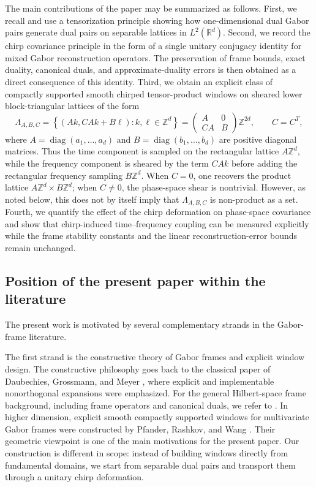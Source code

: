 \documentclass[final,1p,times,authoryear]{elsarticle}
\theoremstyle{definition}
\newcommand{\R}{\mathbb{R}}
\newcommand{\Z}{\mathbb{Z}}
\newcommand{\1}{\mathbf{1}}
\begin{document}
The main contributions of the paper may be summarized as follows. First, we recall and use a
tensorization principle showing how one-dimensional dual Gabor pairs generate dual pairs on separable
lattices in $L^2(\R^d)$. {Second, we record the chirp covariance principle in the form of a single unitary conjugacy
identity for mixed Gabor reconstruction operators. The preservation of frame bounds, exact
duality, canonical duals, and approximate-duality errors is then obtained as a direct consequence
of this identity.}
{Third, we obtain an explicit class of compactly supported smooth chirped tensor-product windows
on sheared lower block-triangular lattices of the form
$$
\Lambda_{A,B,C}
=
\left\{(Ak,CAk+B\ell): k,\ell\in\Z^d\right\}
=
\begin{pmatrix}
A&0\\
CA&B
\end{pmatrix}\Z^{2d},
\qquad C=C^T,
$$
where $A=\operatorname{diag}(a_1,\dots,a_d)$ and $B=\operatorname{diag}(b_1,\dots,b_d)$ are positive
diagonal matrices. Thus the time component is sampled on the rectangular lattice $A\Z^d$, while the
frequency component is sheared by the term $CAk$ before adding the rectangular frequency sampling
$B\Z^d$. When $C=0$, one recovers the product lattice $A\Z^d\times B\Z^d$; when $C\neq0$, the
phase-space shear is nontrivial. However, as noted below, this does not by itself imply that
$\Lambda_{A,B,C}$ is non-product as a set.}
{Fourth, we quantify the effect of the chirp deformation on phase-space covariance and show that
chirp-induced time--frequency coupling can be measured explicitly while the frame stability constants
and the linear reconstruction-error bounds remain unchanged.}

\subsection{Position of the present paper within the literature}

The present work is motivated by several complementary strands in the Gabor-frame literature.

The first strand is the constructive theory of Gabor frames and explicit window design. The constructive
philosophy goes back to the classical paper of Daubechies, Grossmann, and Meyer \citep{DGM86}, where explicit
and implementable nonorthogonal expansions were emphasized. For the general Hilbert-space frame background,
including frame operators and canonical duals, we refer to \citet{Christensen2016}. In higher dimension,
explicit smooth compactly supported windows for multivariate Gabor frames were constructed by Pfander,
Rashkov, and Wang \citep{PRW12}. Their geometric viewpoint is one of the main motivations for the present
paper. Our construction is different in scope: instead of building windows directly from fundamental domains,
we start from separable dual pairs and transport them through a unitary chirp deformation.
\end{document}
